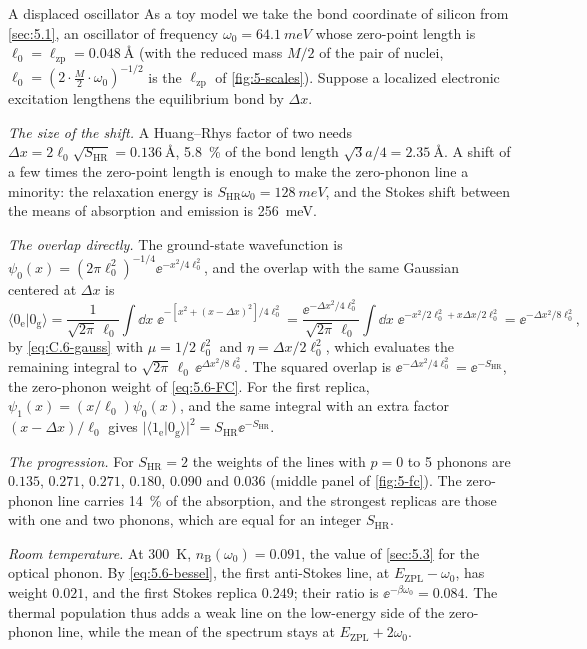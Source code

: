 \begin{workedexample}{A displaced oscillator}\label{we:5-displaced}
As a toy model we take the bond coordinate of silicon from \cref{sec:5.1}, an oscillator of frequency $\omega_0 = \SI{64.1}{meV}$ whose zero-point length is $\ell_0 = \ell_{\mathrm{zp}} = \SI{0.048}{\angstrom}$ (with the reduced mass $M/2$ of the pair of nuclei, $\ell_0 = (2\cdot\tfrac{M}{2}\cdot\omega_0)^{-1/2}$ is the $\ell_{\mathrm{zp}}$ of \cref{fig:5-scales}). Suppose a localized electronic excitation lengthens the equilibrium bond by $\Delta x$.

\emph{The size of the shift.} A Huang--Rhys factor of two needs $\Delta x = 2\ell_0\sqrt{S_{\mathrm{HR}}} = \SI{0.136}{\angstrom}$, \SI{5.8}{\percent} of the bond length $\sqrt3a/4 = \SI{2.35}{\angstrom}$. A shift of a few times the zero-point length is enough to make the zero-phonon line a minority: the relaxation energy is $S_{\mathrm{HR}}\omega_0 = \SI{128}{meV}$, and the Stokes shift between the means of absorption and emission is \SI{256}{meV}.

\emph{The overlap directly.} The ground-state wavefunction is $\psi_0(x) = (2\pi\ell_0^2)^{-1/4}\ee^{-x^2/4\ell_0^2}$, and the overlap with the same Gaussian centered at $\Delta x$ is
\begin{equation*}
  \langle0_{\mathrm{e}}|0_{\mathrm{g}}\rangle = \frac{1}{\sqrt{2\pi}\,\ell_0}\int\dd x\;\ee^{-[x^2 + (x - \Delta x)^2]/4\ell_0^2}
  = \frac{\ee^{-\Delta x^2/4\ell_0^2}}{\sqrt{2\pi}\,\ell_0}\int\dd x\;\ee^{-x^2/2\ell_0^2 + x\Delta x/2\ell_0^2}
  = \ee^{-\Delta x^2/8\ell_0^2} ,
\end{equation*}
by \cref{eq:C.6-gauss} with $\mu = 1/2\ell_0^2$ and $\eta = \Delta x/2\ell_0^2$, which evaluates the remaining integral to $\sqrt{2\pi}\,\ell_0\,\ee^{\Delta x^2/8\ell_0^2}$. The squared overlap is $\ee^{-\Delta x^2/4\ell_0^2} = \ee^{-S_{\mathrm{HR}}}$, the zero-phonon weight of \cref{eq:5.6-FC}. For the first replica, $\psi_1(x) = (x/\ell_0)\psi_0(x)$, and the same integral with an extra factor $(x - \Delta x)/\ell_0$ gives $|\langle1_{\mathrm{e}}|0_{\mathrm{g}}\rangle|^2 = S_{\mathrm{HR}}\ee^{-S_{\mathrm{HR}}}$.

\emph{The progression.} For $S_{\mathrm{HR}} = 2$ the weights of the lines with $p = 0$ to 5 phonons are $0.135$, $0.271$, $0.271$, $0.180$, $0.090$ and $0.036$ (middle panel of \cref{fig:5-fc}). The zero-phonon line carries \SI{14}{\percent} of the absorption, and the strongest replicas are those with one and two phonons, which are equal for an integer $S_{\mathrm{HR}}$.

\emph{Room temperature.} At \SI{300}{K}, $n_{\mathrm{B}}(\omega_0) = 0.091$, the value of \cref{sec:5.3} for the optical phonon. By \cref{eq:5.6-bessel}, the first anti-Stokes line, at $E_{\mathrm{ZPL}} - \omega_0$, has weight $0.021$, and the first Stokes replica $0.249$; their ratio is $\ee^{-\beta\omega_0} = 0.084$. The thermal population thus adds a weak line on the low-energy side of the zero-phonon line, while the mean of the spectrum stays at $E_{\mathrm{ZPL}} + 2\omega_0$.
\end{workedexample}
